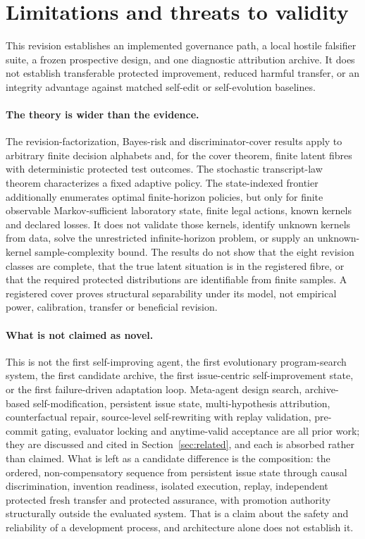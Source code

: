 \section{Limitations and threats to validity}
\label{sec:limitations}

This revision establishes an implemented governance path, a local hostile falsifier suite, a frozen prospective design, and one diagnostic attribution archive. It does not establish transferable protected improvement, reduced harmful transfer, or an integrity advantage against matched self-edit or self-evolution baselines.

\paragraph{The theory is wider than the evidence.}
The revision-factorization, Bayes-risk and discriminator-cover results apply to
arbitrary finite decision alphabets and, for the cover theorem, finite latent
fibres with deterministic protected test outcomes. The stochastic
transcript-law theorem characterizes a fixed adaptive policy. The
state-indexed frontier additionally enumerates optimal finite-horizon policies,
but only for finite observable Markov-sufficient laboratory state, finite legal
actions, known kernels and declared losses. It does not validate those kernels,
identify unknown kernels from data, solve the unrestricted infinite-horizon
problem, or supply an unknown-kernel sample-complexity bound. The results do not
show that the eight revision classes are complete,
that the true latent situation is in the registered fibre, or that the required
protected distributions are identifiable from finite samples. A
registered cover proves structural separability under its model, not empirical
power, calibration, transfer or beneficial revision.

\paragraph{What is not claimed as novel.}
This is not the first self-improving agent, the first evolutionary program-search system, the first candidate archive, the first issue-centric self-improvement state, or the first failure-driven adaptation loop. Meta-agent design search, archive-based self-modification, persistent issue state, multi-hypothesis attribution, counterfactual repair, source-level self-rewriting with replay validation, pre-commit gating, evaluator locking and anytime-valid acceptance are all prior work; they are discussed and cited in Section~\ref{sec:related}, and each is absorbed rather than claimed. What is left as a candidate difference is the composition: the ordered, non-compensatory sequence from persistent issue state through causal discrimination, invention readiness, isolated execution, replay, independent protected fresh transfer and protected assurance, with promotion authority structurally outside the evaluated system. That is a claim about the safety and reliability of a development process, and architecture alone does not establish it.

